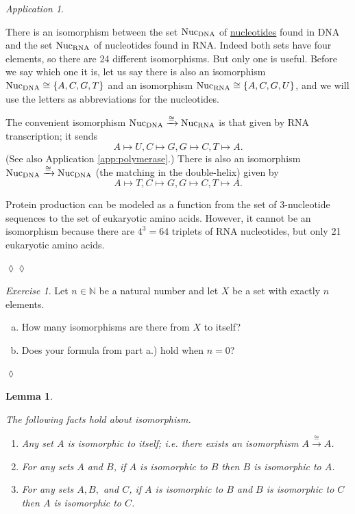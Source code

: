 \documentclass{book}
\def\tn{\textnormal}
\def\NN{{\mathbb N}}
\def\iso{\cong}
\newcommand{\To}[1]{\xrightarrow{#1}}
\newtheorem{lemma}[subsubsection]{Lemma}
\theoremstyle{remark}
\newtheorem{exc}[subsubsection]{Exercise}
\newenvironment{exercise}{\begin{exc}}{\hspace*{\fill}$\lozenge$\end{exc}}
\newtheorem{app}[subsubsection]{Application}
\newenvironment{application}{\begin{app}}{\hspace*{\fill}$\lozenge\lozenge$\end{app}}
\theoremstyle{definition}
\def\sexc{\begin{enumerate}[a.)]\setlength{\itemsep}{.1cm}\setlength{\parskip}{.1cm}\item}
\def\next{\item}
\def\endsexc{\end{enumerate}}
\begin{document}
\begin{application}\label{app:DNA RNA}

There is an isomorphism between the set $\tn{Nuc}_\tn{DNA}$ of \href{http://en.wikipedia.org/wiki/Nucleotides}{\text nucleotides} found in DNA and the set $\tn{Nuc}_\tn{RNA}$ of nucleotides found in RNA. Indeed both sets have four elements, so there are 24 different isomorphisms. But only one is useful. Before we say which one it is, let us say there is also an isomorphism $\tn{Nuc}_\tn{DNA}\iso\{A,C,G,T\}$ and an isomorphism $\tn{Nuc}_\tn{RNA}\iso\{A,C,G,U\}$, and we will use the letters as abbreviations for the nucleotides. 

The convenient isomorphism $\tn{Nuc}_\tn{DNA}\To{\iso}\tn{Nuc}_\tn{RNA}$ is that given by RNA transcription; it sends 
$$A\mapsto U, C\mapsto G, G\mapsto C, T\mapsto A.$$ 
(See also Application \ref{app:polymerase}.) There is also an isomorphism $\tn{Nuc}_\tn{DNA}\To{\iso}\tn{Nuc}_\tn{DNA}$ (the matching in the double-helix) given by 
$$A\mapsto T, C\mapsto G, G\mapsto C, T\mapsto A.$$

Protein production can be modeled as a function from the set of 3-nucleotide sequences to the set of eukaryotic amino acids. However, it cannot be an isomorphism because there are $4^3=64$ triplets of RNA nucleotides, but only 21 eukaryotic amino acids. 

\end{application}

\begin{exercise}
Let $n\in\NN$ be a natural number and let $X$ be a set with exactly $n$ elements. 
\sexc How many isomorphisms are there from $X$ to itself? 
\next Does your formula from part a.) hold when $n=0$?
\endsexc
\end{exercise}

\begin{lemma}\label{lemma:isomorphic ER in Set}

The following facts hold about isomorphism.
\begin{enumerate}
\item Any set $A$ is isomorphic to itself; i.e. there exists an isomorphism $A\To{\iso} A$.
\item For any sets $A$ and $B$, if $A$ is isomorphic to $B$ then $B$ is isomorphic to $A$.
\item For any sets $A, B,$ and $C$, if $A$ is isomorphic to $B$ and $B$ is isomorphic to $C$ then $A$ is isomorphic to $C$.
\end{enumerate}

\end{lemma}
\end{document}
